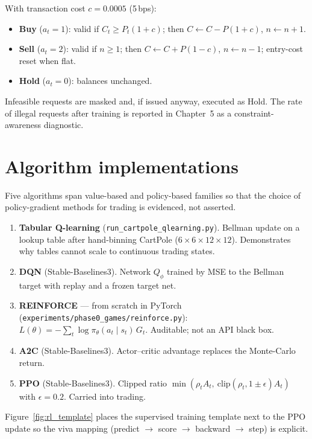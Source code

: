 With transaction cost $c = 0.0005$ (5\,bps):
\begin{itemize}[leftmargin=*]
  \item \textbf{Buy} ($a_t{=}1$): valid if $C_t \geq P_t(1+c)$; then $C \leftarrow C - P(1+c)$, $n \leftarrow n+1$.
  \item \textbf{Sell} ($a_t{=}2$): valid if $n \geq 1$; then $C \leftarrow C + P(1-c)$, $n \leftarrow n-1$; entry-cost reset when flat.
  \item \textbf{Hold} ($a_t{=}0$): balances unchanged.
\end{itemize}
Infeasible requests are masked and, if issued anyway, executed as Hold. The rate of illegal requests after training is reported in Chapter~5 as a constraint-awareness diagnostic.

\section{Algorithm implementations}
\label{sec:algorithms_simple}

Five algorithms span value-based and policy-based families so that the choice of policy-gradient methods for trading is evidenced, not asserted.

\begin{enumerate}[leftmargin=*]
  \item \textbf{Tabular Q-learning} (\texttt{run\_cartpole\_qlearning.py}). Bellman update on a lookup table after hand-binning CartPole ($6{\times}6{\times}12{\times}12$). Demonstrates why tables cannot scale to continuous trading states.
  \item \textbf{DQN} (Stable-Baselines3). Network $Q_\phi$ trained by MSE to the Bellman target with replay and a frozen target net.
  \item \textbf{REINFORCE} --- from scratch in PyTorch (\texttt{experiments/phase0\_games/reinforce.py}): $L(\theta)=-\sum_t \log\pi_\theta(a_t\mid s_t)\,G_t$. Auditable; not an API black box.
  \item \textbf{A2C} (Stable-Baselines3). Actor--critic advantage replaces the Monte-Carlo return.
  \item \textbf{PPO} (Stable-Baselines3). Clipped ratio $\min(\rho_t A_t,\ \mathrm{clip}(\rho_t,1\pm\epsilon)A_t)$ with $\epsilon{=}0.2$. Carried into trading.
\end{enumerate}

Figure~\ref{fig:rl_template} places the supervised training template next to the PPO update so the viva mapping (predict $\to$ score $\to$ backward $\to$ step) is explicit.

